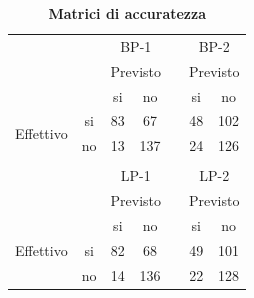 %
\begin{table}[htbp]
\centering
\begin{tabular}{cccclcc}
                           &                         & \multicolumn{2}{c}{BP-1}                           &                       & \multicolumn{2}{c}{BP-2}                           \\
                           &                         & \multicolumn{2}{c}{Previsto}                       &                       & \multicolumn{2}{c}{Previsto}                       \\
                           &                         & si                      & no                       &                       & si                      & no                       \\ \cline{3-4} \cline{6-7} 
\multirow{2}{*}{Effettivo} & \multicolumn{1}{c|}{si} & \multicolumn{1}{c|}{83} & \multicolumn{1}{c|}{67} & \multicolumn{1}{l|}{} & \multicolumn{1}{c|}{48} & \multicolumn{1}{c|}{102} \\ \cline{3-4} \cline{6-7} 
                           & \multicolumn{1}{c|}{no} & \multicolumn{1}{c|}{13} & \multicolumn{1}{c|}{137} & \multicolumn{1}{l|}{} & \multicolumn{1}{c|}{24} & \multicolumn{1}{c|}{126} \\ \cline{3-4} \cline{6-7} 
                           &                         &                         &                          &                       &                         &                          \\
                           &                         & \multicolumn{2}{c}{LP-1}                           &                       & \multicolumn{2}{c}{LP-2}                           \\
                           &                         & \multicolumn{2}{c}{Previsto}                       &                       & \multicolumn{2}{c}{Previsto}                       \\
                           &                         & si                      & no                       &                       & si                      & no                       \\ \cline{3-4} \cline{6-7} 
Effettivo                  & \multicolumn{1}{c|}{si} & \multicolumn{1}{c|}{82} & \multicolumn{1}{c|}{68} & \multicolumn{1}{l|}{} & \multicolumn{1}{c|}{49} & \multicolumn{1}{c|}{101} \\ \cline{3-4} \cline{6-7} 
                           & \multicolumn{1}{c|}{no} & \multicolumn{1}{c|}{14} & \multicolumn{1}{c|}{136} & \multicolumn{1}{l|}{} & \multicolumn{1}{c|}{22} & \multicolumn{1}{c|}{128} \\ \cline{3-4} \cline{6-7} 
\end{tabular}
\caption[Distribuzione congiunta degli impulsi emessi e rilevati. Matrice di accuratezza.]{\bf Matrici di accuratezza}
\label{tab:matrici}
\end{table}
%




